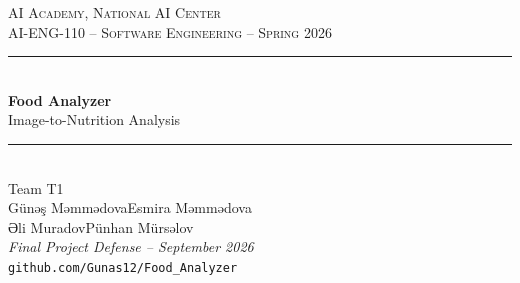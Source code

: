 \documentclass[aspectratio=169,11pt]{beamer}
\newcommand{\teamname}{Team T1}
\newcommand{\memberone}{Günəş Məmmədova}
\newcommand{\membertwo}{Esmira Məmmədova}
\newcommand{\memberthree}{Əli Muradov}
\newcommand{\memberfour}{Pünhan Mürsəlov}
\newcommand{\repolink}{github.com/Gunas12/Food\_Analyzer}
\newcommand{\coursecode}{AI-ENG-110}
\newcommand{\coursename}{Software Engineering}
\newcommand{\institution}{AI Academy, National AI Center}
\newcommand{\semester}{Spring 2026}
\begin{document}
{%
\begin{frame}[plain]
  \begin{center}
    \vspace{0.45cm}
    {\small \textsc{\institution}}\\[0.2em]
    {\small \textsc{\coursecode{} -- \coursename{} -- \semester{}}}\\[1em]
    \rule{0.72\textwidth}{0.6pt}\\[0.35em]
    {\Huge\bfseries\color{accent} Food Analyzer}\\[0.25em]
    {\large Image-to-Nutrition Analysis}\\[0.35em]
    \rule{0.72\textwidth}{0.6pt}\\[0.9em]
    {\large \teamname}\\[0.45em]
    {\normalsize \memberone\quad\textbullet\quad\membertwo}\\[0.2em]
    {\normalsize \memberthree\quad\textbullet\quad\memberfour}\\[0.75em]
    {\footnotesize\itshape Final Project Defense -- September 2026}\\[0.25em]
    {\footnotesize\texttt{\repolink}}
  \end{center}
\end{frame}
}
\end{document}
